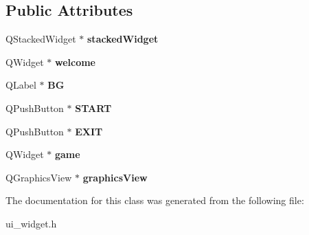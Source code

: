 \subsection*{Public Attributes}
\begin{DoxyCompactItemize}
\item 
\hypertarget{classUi__Widget_ab3f8524a48e84bc0ff069bb0b5df5f77}{Q\-Stacked\-Widget $\ast$ {\bfseries stacked\-Widget}}\label{classUi__Widget_ab3f8524a48e84bc0ff069bb0b5df5f77}

\item 
\hypertarget{classUi__Widget_a09f6fcea73c4bc83c6b94547da0bd00e}{Q\-Widget $\ast$ {\bfseries welcome}}\label{classUi__Widget_a09f6fcea73c4bc83c6b94547da0bd00e}

\item 
\hypertarget{classUi__Widget_a934ad5293e23664ac7860b1a526c46bc}{Q\-Label $\ast$ {\bfseries B\-G}}\label{classUi__Widget_a934ad5293e23664ac7860b1a526c46bc}

\item 
\hypertarget{classUi__Widget_a459a60d23ae04ccf2832346cdb7bbfa6}{Q\-Push\-Button $\ast$ {\bfseries S\-T\-A\-R\-T}}\label{classUi__Widget_a459a60d23ae04ccf2832346cdb7bbfa6}

\item 
\hypertarget{classUi__Widget_a1d0ac3f33786d9a4a641c5a4c5f32918}{Q\-Push\-Button $\ast$ {\bfseries E\-X\-I\-T}}\label{classUi__Widget_a1d0ac3f33786d9a4a641c5a4c5f32918}

\item 
\hypertarget{classUi__Widget_a474f01392a601d6e803d20883051b778}{Q\-Widget $\ast$ {\bfseries game}}\label{classUi__Widget_a474f01392a601d6e803d20883051b778}

\item 
\hypertarget{classUi__Widget_a16341716ac1ccd38cb37d395ccf4e709}{Q\-Graphics\-View $\ast$ {\bfseries graphics\-View}}\label{classUi__Widget_a16341716ac1ccd38cb37d395ccf4e709}

\end{DoxyCompactItemize}


The documentation for this class was generated from the following file\-:\begin{DoxyCompactItemize}
\item 
ui\-\_\-widget.\-h\end{DoxyCompactItemize}
